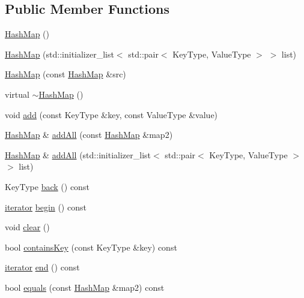 \subsection*{Public Member Functions}
\begin{DoxyCompactItemize}
\item 
\mbox{\hyperlink{classHashMap_a8e7da885280257b837a2de2b94e02fcd}{Hash\+Map}} ()
\item 
\mbox{\hyperlink{classHashMap_a0fe536398ae01b680317eec6ad3a9f9b}{Hash\+Map}} (std\+::initializer\+\_\+list$<$ std\+::pair$<$ Key\+Type, Value\+Type $>$ $>$ list)
\item 
\mbox{\hyperlink{classHashMap_a96e6aff504efee695280e4830388224a}{Hash\+Map}} (const \mbox{\hyperlink{classHashMap}{Hash\+Map}} \&src)
\item 
virtual \mbox{\hyperlink{classHashMap_a1b5fc2ca95329631445bccf7c023b0f6}{$\sim$\+Hash\+Map}} ()
\item 
void \mbox{\hyperlink{classHashMap_a9129d6095063e7e14d85c627d35086a5}{add}} (const Key\+Type \&key, const Value\+Type \&value)
\item 
\mbox{\hyperlink{classHashMap}{Hash\+Map}} \& \mbox{\hyperlink{classHashMap_acda70726afb75a7250066bb06aff7ef9}{add\+All}} (const \mbox{\hyperlink{classHashMap}{Hash\+Map}} \&map2)
\item 
\mbox{\hyperlink{classHashMap}{Hash\+Map}} \& \mbox{\hyperlink{classHashMap_af3638dd6e98fa26a140ace936586fb47}{add\+All}} (std\+::initializer\+\_\+list$<$ std\+::pair$<$ Key\+Type, Value\+Type $>$ $>$ list)
\item 
Key\+Type \mbox{\hyperlink{classHashMap_adfa4b8f8e4f5ecc11fb76a3efba70d70}{back}} () const
\item 
\mbox{\hyperlink{classHashMap_1_1iterator}{iterator}} \mbox{\hyperlink{classHashMap_a0c62c15c8ed609e7e5e9518cf5f5c712}{begin}} () const
\item 
void \mbox{\hyperlink{classHashMap_ac8bb3912a3ce86b15842e79d0b421204}{clear}} ()
\item 
bool \mbox{\hyperlink{classHashMap_a37473445b6725c5f0fc59a32ea2e645e}{contains\+Key}} (const Key\+Type \&key) const
\item 
\mbox{\hyperlink{classHashMap_1_1iterator}{iterator}} \mbox{\hyperlink{classHashMap_a68b688a51bd0cf6fb5bc2cba292209a8}{end}} () const
\item 
bool \mbox{\hyperlink{classHashMap_a2f1c1f416ba37a002b491d1ea54cd40e}{equals}} (const \mbox{\hyperlink{classHashMap}{Hash\+Map}} \&map2) const
\item 

\end{DoxyCompactItemize}
